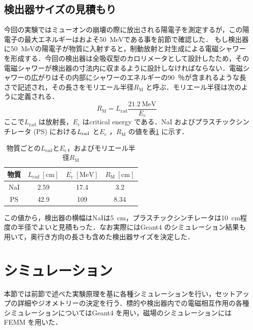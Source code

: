 \subsection{検出器サイズの見積もり}
今回の実験ではミューオンの崩壊の際に放出される陽電子を測定するが，この陽電子の最大エネルギーはおよそ50~MeVである事を前節で確認した．
もし検出器に50~MeVの陽電子が物質に入射すると，制動放射と対生成による電磁シャワーを形成する．今回の検出器は全吸収型のカロリメータとして設計したため，その電磁シャワーが検出器の寸法内に収まるように設計しなければならない．電磁シャワーの広がりはその内部にシャワーのエネルギーの90~％が含まれるような長さで記述され，その長さをモリエール半径$R_\mathrm{M}$ と呼ぶ．モリエール半径は次のように定義される．
\begin{equation}
R_\mathrm{M} = L_\mathrm{rad}\frac{21.2~\mathrm{MeV}}{E_\mathrm{c}}
\end{equation}
ここで$L_\mathrm{rad}$ は放射長，$E_\mathrm{c}$ はcritical energy である．NaI およびプラスチックシンチレータ (PS) における$L_{\rm rad}$ と$E_\mathrm{c}$ ，$R_\mathrm{M}$ の値を表\ref{tab:abe_rm} に示す．
\begin{table}[hbtp]
\centering
\begin{tabular}{cccc}\toprule
物質 & $L_\mathrm{rad}~[\mathrm{cm}]$ & $E_\mathrm{c}~[\mathrm{MeV}]$ & $R_\mathrm{M}~[\mathrm{cm}]$ \\ \midrule
NaI & 2.59 & 17.4 & 3.2 \\
PS & 42.9 & 109 & 8.34 \\ \bottomrule
\end{tabular}
\caption{物質ごとの$L_\mathrm{rad}$と$E_\mathrm{c}$，およびモリエール半径$R_\mathrm{M}$}
\label{tab:abe_rm}
\end{table}
この値から，検出器の横幅はNaIは5~cm，プラスチックシンチレータは10~cm程度の半径でよいと見積もった．なお実際にはGeant4 のシミュレーション結果も用いて，奥行き方向の長さも含めた検出器サイズを決定した．
\newpage

\section{シミュレーション}%
本節では前節で述べた実験原理を基に各種シミュレーションを行い，セットアップの詳細やジオメトリーの決定を行う．標的や検出器内での電磁相互作用の各種シミュレーションについてはGeant4 を用い，磁場のシミュレーションにはFEMM を用いた．
	
